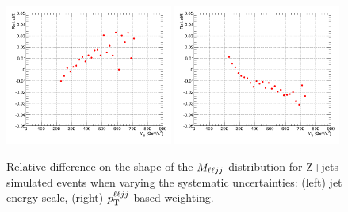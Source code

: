 \begin{figure}[htb]
\begin{center}
\centerline{
\includegraphics[width=0.49\textwidth]{plots/dy2_jsm.png}
\includegraphics[width=0.49\textwidth]{plots/dy2_pthe.png}
}
\caption{Relative difference on the shape of the $M_{\ell\ell jj}$ distribution for Z+jets simulated
events when varying the systematic uncertainties: (left) jet energy scale,
(right) $p_{\mathrm{T}}^{\ell\ell jj}$-based weighting.
}
\label{fig:sysshape2d}
\end{center}
\end{figure}

